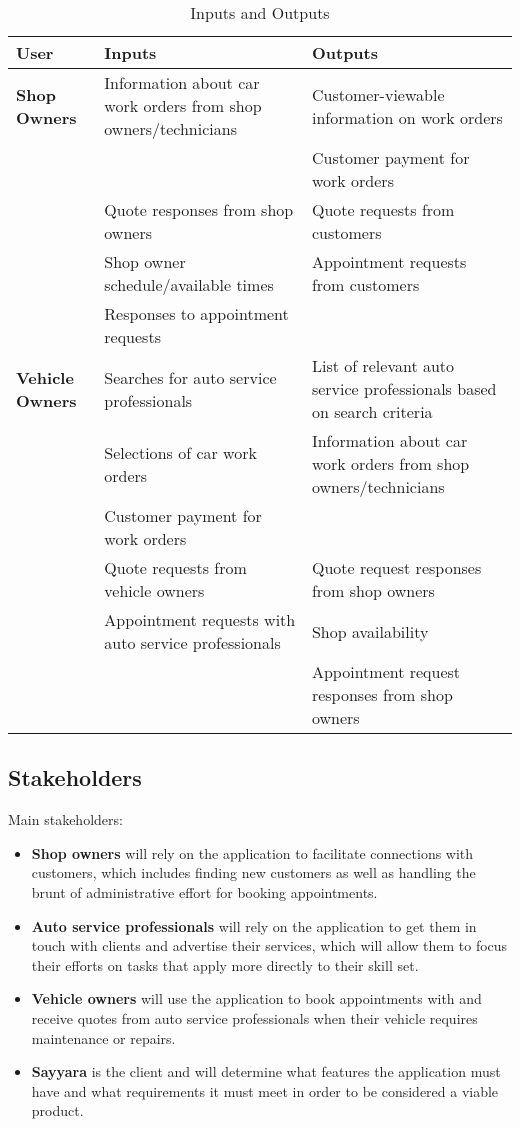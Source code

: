 \documentclass{article}
\begin{document}
\begin{center}
\begin{longtable}{ | p{3cm} | p{4cm} | p{4cm} |}
\caption{Inputs and Outputs}
\label{tab:inputsOutputs}
\\ \hline
\textbf{User} & \textbf{Inputs} & \textbf{Outputs} \\ \hline
\textbf{Shop Owners} & Information about car work orders from shop owners/technicians & Customer-viewable information on work orders \\ \hline
& & Customer payment for work orders \\ \cline{2-3}
& Quote responses from shop owners & Quote requests from customers \\ \cline{2-3}
& Shop owner schedule/available times & Appointment requests from customers \\ \cline{2-3}
& Responses to appointment requests & \\ \hline
\textbf{Vehicle Owners} & Searches for auto service professionals & List of relevant auto service professionals based on search criteria \\ \cline{2-3}
& Selections of car work orders & Information about car work orders from shop owners/technicians \\ \cline{2-3}
& Customer payment for work orders & \\ \cline{2-3}
& Quote requests from vehicle owners & Quote request responses from shop owners \\ \cline{2-3}
& Appointment requests with auto service professionals & Shop availability \\ \cline{2-3}
& & Appointment request responses from shop owners \\ \hline
\end{longtable}
\end{center}

\subsection{Stakeholders}

Main stakeholders:

\begin{itemize}
    \item \textbf{Shop owners} will rely on the application to facilitate connections with customers, which includes finding new customers as well as handling the brunt of administrative effort for booking appointments.
    \item \textbf{Auto service professionals} will rely on the application to get them in touch with clients and advertise their services, which will allow them to focus their efforts on tasks that apply more directly to their skill set.
    \item \textbf{Vehicle owners} will use the application to book appointments with and receive quotes from auto service professionals when their vehicle requires maintenance or repairs.
    \item \textbf{Sayyara} is the client and will determine what features the application must have and what requirements it must meet in order to be considered a viable product.
\end{itemize}
\end{document}
